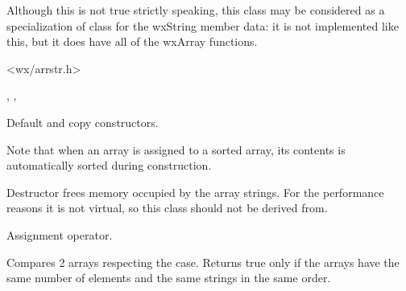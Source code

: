 
Although this is not true strictly speaking, this class may be considered as a
specialization of  class for the wxString member
data: it is not implemented like this, but it does have all of the wxArray
functions.


<wx/arrstr.h>


, , 


\label{wxarraystringctor}



Default and copy constructors.

Note that when an array is assigned to a sorted array, its contents is
automatically sorted during construction.

\label{wxarraystringdtor}


Destructor frees memory occupied by the array strings. For the performance
reasons it is not virtual, so this class should not be derived from.

\label{wxarraystringoperatorassign}


Assignment operator.

\label{wxarraystringoperatorequal}


Compares 2 arrays respecting the case. Returns true only if the arrays have
the same number of elements and the same strings in the same order.

\label{wxarraystringoperatornotequal}



